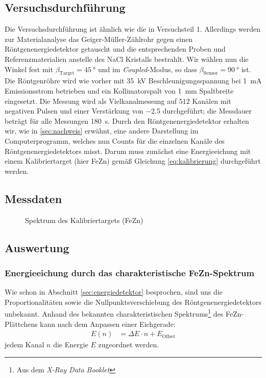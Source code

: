 \documentclass[11pt, a4paper]{article}
\begin{document}
\subsection{Versuchsdurchführung}
Die Versuchsdurchführung ist ähnlich wie die in Versuchsteil 1.
Allerdings werden zur Materialanalyse das Geiger-Müller-Zählrohr gegen einen Röntgenenergiedetektor getauscht und die entsprechenden Proben und Referenzmaterialien anstelle des NaCl Kristalls bestrahlt.
Wir wählen nun die Winkel fest mit $\beta_\mathrm{Target}=\SI{45}{\degree}$ und im \emph{Coupled}-Modus, so dass $\beta_\mathrm{Sensor} = \SI{90}{\degree}$ ist.
Die Röntgenröhre wird wie vorher mit \SI{35}{\kilo\volt} Beschleunigungsspannung bei \SI{1}{\milli\ampere} Emissionsstrom betrieben und ein Kollimatorspalt von \SI{1}{\milli\metre} Spaltbreite eingesetzt.
Die Messung wird als Vielkanalmessung auf $512$ Kanälen mit negativen Pulsen und einer Verstärkung von \num{-2.5} durchgeführt; die Messdauer beträgt für alle Messungen \SI{180}{\second}.
Durch den Röntgenenergiedetektor erhalten wir, wie in \ref{sec:nachweis} erwähnt, eine andere Darstellung im Computerprogramm, welches nun Counts für die einzelnen Kanäle des Röntgenenergiedetektors misst. Darum muss zunächst eine Energieeichung mit einem Kalibriertarget (hier FeZn) gemäß Gleichung \ref{eq:kalibrierung} durchgeführt werden.

\subsection{Messdaten}
\begin{figure}[!h]
\centering

\caption{Spektrum des Kalibriertargets (FeZn)}
\label{fig:kalibrierung}
\end{figure}

\subsection{Auswertung}
\subsubsection{Energieeichung durch das charakteristische FeZn-Spektrum}
Wie schon in Abschnitt \ref{sec:energiedetektor} besprochen, sind uns die Proportionalitäten sowie die Nullpunktsverschiebung des Röntgenenergiedetektors unbekannt.
Anhand des bekannten charakteristischen Spektrums\footnote{Aus dem \emph{X-Ray Data Booklet}\cite{booklet}} des FeZn-Plättchens kann nach dem Anpassen einer Eichgerade:
\begin{align}
  E(n) &= \Delta E \cdot n + E_\mathrm{Offset}
  \label{eq:eichgerade}
\end{align}
jedem Kanal $n$ die Energie $E$ zugeordnet werden.
\end{document}
